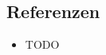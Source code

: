 
\usepackage{amsmath} 





\section*{}








\subsection*{Referenzen}
\begin{itemize}
\item TODO
\end{itemize}


